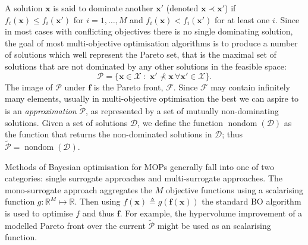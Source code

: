 \documentclass[conference]{IEEEtran}
\newcommand{\evaluatedx}{\bX}
\newcommand{\paretofront}{\mathcal{F}}
\newcommand{\paretoset}{\mathcal{P}}
\newcommand{\attainmentfront}{\mathcal{A}}
\newcommand{\attainmentset}{\evaluatedx_{\mathcal{A}}}
\newcommand{\parameterspace}{\mathcal{X}}
\newcommand{\nobj}{M}
\newcommand{\defn}{\triangleq}
\DeclareMathOperator{\nondom}{nondom}
\newcommand\Papprox{\tilde{\mathcal{P}}}
\newcommand{\bx}{\mathbf{x}}
\newcommand{\bX}{\mathbf{X}}
\newcommand{\bff}{\mathbf{f}}
\newcommand{\data}{\mathcal{D}}
\newcommand{\mnote}[2][\textcolor{red}{\dagger}]{$#1$\marginpar{\color{red}\raggedright\tiny$#1$
    #2}}
\begin{document}
A solution $\bx$ is said to dominate another $\bx'$ (denoted $\bx \prec \bx'$) if $f_i(\bx) \le f_i(\bx')$ for $i = 1, \ldots, \nobj$ and $ f_i(\bx) < f_i(\bx')$ for at least one $i$. Since in most cases with conflicting objectives there is no single dominating solution, the goal of most multi-objective optimisation algorithms is to produce a number of solutions which well represent the Pareto set, that is the maximal set of solutions that are not dominated by any other solutions in the feasible space:
\begin{equation}\label{eqn: Pareto_set}
  \paretoset = \{\mathbf{x} \in \parameterspace \;:\;
  \bx' \not\prec \bx \,\forall \bx' \in \parameterspace \}.
\end{equation}
The image of $\paretoset$ under $\bff$ is the Pareto front, $\paretofront$. Since $\paretofront$ may contain infinitely many elements, usually  in multi-objective optimisation the best we can aspire to is an \emph{approximation} $\Papprox$, as represented by a set of mutually non-dominating solutions.   Given a set of solutions $\data$, we define the function $\nondom(\data)$ as the function that returns the non-dominated solutions in $\data$; thus $\Papprox = \nondom(\data)$.



Methods of Bayesian optimisation for MOPs generally fall into one of two
categories: single surrogate approaches and multi-surrogate approaches. The
mono-surrogate approach aggregates the $\nobj$ objective functions using a
scalarising function $g : \mathbb{R}^\nobj \mapsto \mathbb{R}$. Then using
$f(\bx) \defn g(\bff(\bx))$ the standard BO algorithm is used to optimise
$f$ and thus $\bff$. For example, the hypervolume improvement of a modelled
Pareto front over the current $\Papprox$ might be used as an
scalarising function. 
\end{document}
